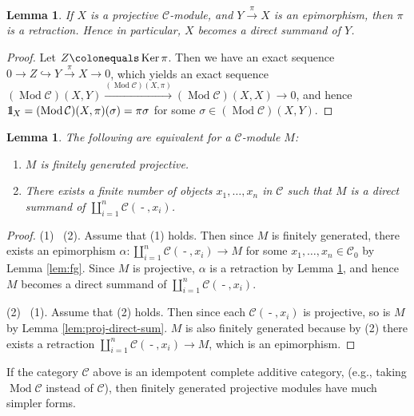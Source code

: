 \documentclass{surv-l}
\numberwithin{equation}{chapter}
\numberwithin{figure}{chapter}
\theoremstyle{plain}
\newtheorem{lem}[thm]{Lemma}
\theoremstyle{definition}
\theoremstyle{remark}
\newcommand{\id}{1\kern-.25em{\text{{\rm l}}}}
\DeclareMathOperator{\Ker}{Ker}
\DeclareMathOperator{\Mod}{Mod}
\DeclareMathOperator{\blank}{-}
\begin{document}
\begin{lem}\label{lem:proj-epi-retr}
If $X$ is a projective ${\mathcal{C}}$-module, and $Y\xrightarrow{\pi} X$ is an epimorphism,
then $\pi$ is a retraction. Hence in particular, $X$ becomes
a direct summand of $Y$.
\end{lem}

\begin{proof}
Let $Z\colonequals  \Ker \pi$.
Then we have an exact sequence
$0\to Z \hookrightarrow Y \xrightarrow{\pi} X \to 0$, which yields an exact sequence
$(\Mod {\mathcal{C}})(X, Y) \xrightarrow{(\Mod {\mathcal{C}})(X, \pi)} (\Mod {\mathcal{C}})(X, X) \to 0$,
and hence
$\id_X = (\Mod {\mathcal{C}})(X, \pi)(\sigma) = \pi\sigma$ for some
$\sigma \in (\Mod {\mathcal{C}})(X, Y)$.
\end{proof}

\begin{lem}\label{lem:fg-proj}
The following are equivalent for a ${\mathcal{C}}$-module $M$:
\begin{enumerate}
\item
$M$ is finitely generated projective.
\item
There exists a finite number of objects $x_1, \dots, x_n$ in ${\mathcal{C}}$ such that
$M$ is a direct summand of $\coprod_{i=1}^n {\mathcal{C}}(\blank, x_i)$.
\end{enumerate}
\end{lem}

\begin{proof}
(1) \text{$\Rightarrow$}\  (2).
Assume that (1) holds.
Then since $M$ is finitely generated,
there exists an epimorphism
$\alpha \colon \coprod_{i=1}^n {\mathcal{C}}(\blank, x_i) \to M$
for some $x_1,\dots, x_n \in {\mathcal{C}}_0$ by Lemma \ref{lem:fg}.
Since $M$ is projective, $\alpha$ is a retraction by Lemma \ref{lem:proj-epi-retr},
and hence $M$ becomes a direct summand of
$\coprod_{i=1}^n {\mathcal{C}}(\blank, x_i)$.

(2) \text{$\Rightarrow$}\  (1).
Assume that (2) holds.
Then since each ${\mathcal{C}}(\blank, x_i)$ is projective,
so is $M$ by Lemma \ref{lem:proj-direct-sum}.
$M$ is also finitely generated because by (2)
there exists a retraction
$\coprod_{i=1}^n {\mathcal{C}}(\blank, x_i) \to M$, which is an epimorphism.
\end{proof}

If the category ${\mathcal{C}}$ above is an idempotent complete additive category,
(e.g., taking $\Mod {\mathcal{C}}$ instead of ${\mathcal{C}}$),
then finitely generated projective modules have much simpler forms.
\end{document}
